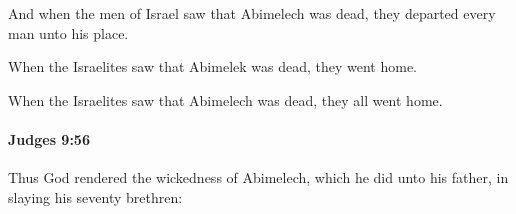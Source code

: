 			\begin{versebox}
					\item[BHS] 
					\item[ASV] And when the men of Israel saw that Abimelech was dead, they departed every man unto his place.
					\item[NIV] When the Israelites saw that Abimelek was dead, they went home.
					\item[NRSV] When the Israelites saw that Abimelech was dead, they all went home.
			\end{versebox}

		\paragraph{Judges 9:56} %
			\label{JUDGES-9-56}

			Thus God rendered the wickedness of Abimelech, which he did unto his father, in slaying his seventy brethren:

